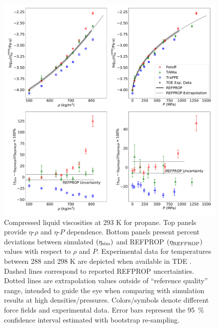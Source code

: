 \documentclass[preprint,review,12pt]{elsarticle}
\begin{document}
	\begin{figure}[H]
		\centering
		\includegraphics[width=6.4in]{compare_REFPROP_T293highP_C3H8.pdf}
		\caption{Compressed liquid viscosities at 293 K for propane. Top panels provide $\eta$-$\rho$ and $\eta$-$P$ dependence. Bottom panels present percent deviations between simulated $(\eta_{\rm sim})$ and REFPROP \cite{LEMMON-RP10} $(\eta_{\rm REFPROP})$ values with respect to $\rho$ and $P$. Experimental data for temperatures between 288 and 298 K are depicted when available in TDE \cite{TDE}. Dashed lines correspond to reported REFPROP uncertainties. Dotted lines are extrapolation values outside of ``reference quality'' range, intended to guide the eye when comparing with simulation results at high densities/pressures. Colors/symbols denote different force fields and experimental data. Error bars represent the 95~\% confidence interval estimated with bootstrap re-sampling.}
		\label{fig:T293highP_C3}
	\end{figure} 
	
\end{document}
